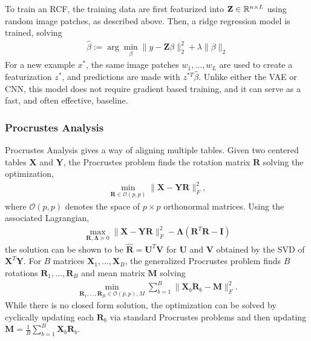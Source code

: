 To train an RCF, the training data are first featurized into $\mathbf{Z} \in
\mathbb{R}^{n \times L}$ using random image patches, as described above. Then, a
ridge regression model is trained, solving
\begin{align*}
\hat{\beta} := \arg \min_{\beta} \|y - \mathbf{Z}\beta\|_{2}^{2} + \lambda \|\beta\|_{2}
\end{align*}
For a new example $x^{\ast}$, the same image patches $w_{1}, \dots, w_{L}$ are
used to create a featurization $z^{\ast}$, and predictions are made with
$z^{\ast T}\hat{\beta}$. Unlike either the VAE or CNN, this model does not
require gradient based training, and it can serve as a fast, and often
effective, baseline.

\subsubsection{Procrustes Analysis}
Procrustes Analysis gives a way of aligning multiple tables. Given two centered
tables $\mathbf{X}$ and $\mathbf{Y}$, the Procrustes problem finds the rotation
matrix $\mathbf{R}$ solving the optimization,
\begin{align*}
\min_{\mathbf{R} \in \mathcal{O}\left(p, p\right)} \|\mathbf{X} - \mathbf{Y}\mathbf{R}\|^{2}_{F},
\end{align*}
where $\mathcal{O}\left(p, p\right)$ denotes the space of $p\times p$
orthonormal matrices. Using the associated Lagrangian,
\begin{align*}
\max_{\mathbf{R}, \mathbf{\Lambda} \succeq 0} \|\mathbf{X} - \mathbf{Y}\mathbf{R}\|_{F}^{2} - \mathbf{\Lambda}\left(\mathbf{R}^{T}\mathbf{R} - \mathbf{I}\right)
\end{align*}
the solution can be shown to be $\hat{\mathbf{R}} = \mathbf{U}^{T}\mathbf{V}$
for $\mathbf{U}$ and $\mathbf{V}$ obtained by the SVD of
$\mathbf{X}^{T}\mathbf{Y}$. For $B$ matrices $\mathbf{X}_{1}, \dots,
\mathbf{X}_{B}$, the generalized Procrustes problem finds $B$ rotations
$\mathbf{R}_{1}, \dots, \mathbf{R}_{B}$ and mean matrix $\mathbf{M}$ solving
\begin{align*}
\min_{\mathbf{R}_{1}, \dots, \mathbf{R}_{B} \in \mathcal{O}\left(p, p\right), M} \sum_{b = 1}^{B} \|\mathbf{X}_{b}\mathbf{R}_{b} - \mathbf{M}\|_{F}^{2}.
\end{align*}
While there is no closed form solution, the optimization can be solved by
cyclically updating each $\mathbf{R}_{b}$ via standard Procrustes problems and
then updating $\mathbf{M} = \frac{1}{B} \sum_{b = 1}^{B} \mathbf{X}_{b}
\mathbf{R}_{b}$.

